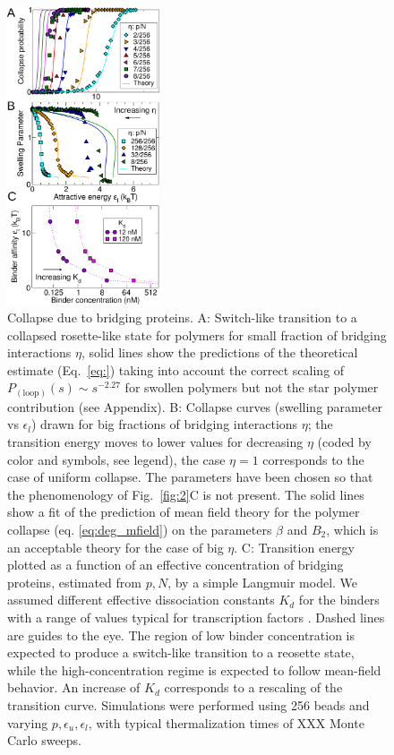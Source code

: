 \documentclass[
preprint,
a4paper,
12pt,
superscriptaddress,
pre]{revtex4}
\begin{document}
\begin{figure}
  \centering
  \includegraphics[width=0.4\textwidth]{fig3}
  \caption{Collapse due to bridging proteins.  A: Switch-like
    transition to a collapsed rosette-like state for polymers for
    small fraction of 
    bridging interactions $\eta$, solid lines show the predictions of
    the theoretical estimate (Eq.~\ref{eq:}) taking into account the
    correct scaling of 
    $P_\mathrm{(loop)}(s) \sim s^{-2.27}$ for swollen polymers but not the star
    polymer contribution (see Appendix).
%
B: Collapse curves (swelling parameter vs
    $\epsilon_l$) drawn for big fractions of bridging
    interactions $\eta$; the transition energy moves to
    lower values for decreasing $\eta$ (coded by color and
    symbols, see legend), the case $\eta=1$ corresponds to the case of
    uniform collapse. The parameters have been chosen so that the
    phenomenology of Fig.~\ref{fig:2}C is not present. The solid lines
    show a fit of the prediction of mean field theory for the polymer
    collapse (eq. \ref{eq:deg_mfield}) on the parameters $\beta$ and
    $B_2$, which is an acceptable theory for the case of big $\eta$.
C:  Transition energy plotted as a function of an effective
concentration  of bridging proteins, estimated  from $p,N$, by a
simple 
Langmuir model. We assumed different effective dissociation constants $K_d$ 
for the binders with a range of values typical for transcription
factors \cite{Buchler29042003}. Dashed lines are guides to the
eye. The region of low binder concentration is expected to produce a
switch-like transition to a reosette state, while the
high-concentration regime is expected to follow mean-field behavior. An
increase of $K_d$ corresponds to a rescaling of the transition curve. 
%
Simulations were performed using 256 beads and varying
$p,\epsilon_u,\epsilon_l$, with typical thermalization times of XXX
Monte Carlo sweeps.  }
  \label{fig:3}
\end{figure}
\end{document}
